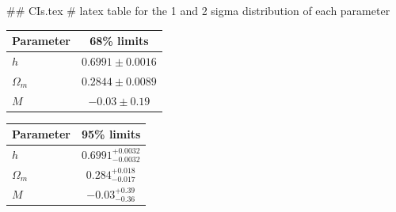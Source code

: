 ## CIs.tex
# latex table for the 1 and 2 sigma distribution of each parameter

\begin{tabular} { l  c}
 Parameter &  68\% limits\\
\hline
{\boldmath$h              $} & $0.6991\pm 0.0016          $\\
{\boldmath$\Omega_m       $} & $0.2844\pm 0.0089          $\\
{\boldmath$M              $} & $-0.03\pm 0.19             $\\
\hline
\end{tabular}

\begin{tabular} { l  c}
 Parameter &  95\% limits\\
\hline
{\boldmath$h              $} & $0.6991^{+0.0032}_{-0.0032}$\\
{\boldmath$\Omega_m       $} & $0.284^{+0.018}_{-0.017}   $\\
{\boldmath$M              $} & $-0.03^{+0.39}_{-0.36}     $\\
\hline
\end{tabular}
